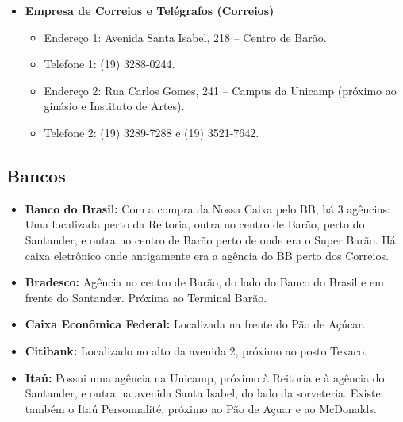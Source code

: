 \begin{itemize}
\item  \textbf{Empresa de Correios e Telégrafos (Correios)}
\begin{itemize}
\item  Endereço 1: Avenida Santa Isabel, 218 -- Centro de Barão.
\item  Telefone 1: (19) 3288-0244.
\item  Endereço 2: Rua Carlos Gomes, 241 -- Campus da Unicamp (próximo ao ginásio e Instituto de Artes).
\item  Telefone 2: (19) 3289-7288 e (19) 3521-7642.
\end{itemize}
\end{itemize}

\subsection{Bancos}

\begin{itemize}
\item  \textbf{Banco do Brasil:} Com a compra da Nossa Caixa pelo BB, há 3 agências: Uma localizada perto da Reitoria, outra no centro de Barão, perto do Santander, e outra no centro de Barão perto de onde era o Super Barão. Há caixa eletrônico onde antigamente era a agência do BB perto dos Correios.
\end{itemize}

\begin{itemize}
\item  \textbf{Bradesco:} Agência no centro de Barão, do lado do Banco do Brasil e em frente do Santander. Próxima ao Terminal Barão.
\end{itemize}

\begin{itemize}
\item  \textbf{Caixa Econômica Federal:} Localizada na frente do Pão de Açúcar.
\end{itemize}

\begin{itemize}
\item  \textbf{Citibank:} Localizado no alto da avenida 2, próximo ao posto Texaco.
\end{itemize}

\begin{itemize}
\item  \textbf{Itaú:} Possui uma agência na Unicamp, próximo à Reitoria e à agência do Santander, e outra na avenida Santa Isabel, do lado da sorveteria. Existe também o Itaú Personnalité, próximo ao Pão de Açuar e ao McDonalds.
\end{itemize}

